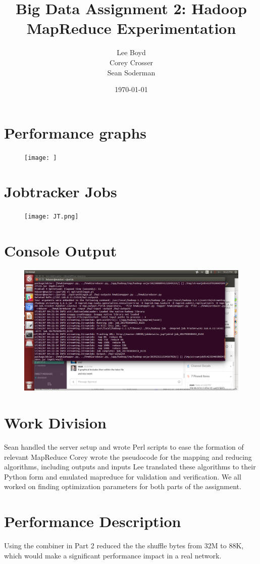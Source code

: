 \documentclass[14pt]{extarticle}
\begin{document}
\title{Big Data Assignment 2: Hadoop MapReduce Experimentation}
\author{Lee Boyd \\
        Corey Crosser \\
        Sean Soderman
        }
\date{\today}
\maketitle

\section{Performance graphs}

\begin{figure}[H]
\centering
\texttt{[image: ]}
\caption{}
\end{figure}


\section{Jobtracker Jobs}
\begin{figure}[H]
\centering
\texttt{[image: JT.png]}
\caption{}
\end{figure}


\section{Console Output}
\begin{figure}[H]
\centering
\includegraphics[width=5.2in]{consolescrnshot.png}
\caption{}
\end{figure}

\section{Work Division}
Sean handled the server setup and wrote Perl scripts to ease the formation of relevant MapReduce 
Corey wrote the pseudocode for the mapping and reducing algorithms, including outputs and inputs
Lee translated these algorithms to their Python form and emulated mapreduce for validation and verification. 
We all worked on finding optimization parameters for both parts of the assignment. 

\section{Performance Description}
Using the combiner in Part 2 reduced the the shuffle bytes from 32M to 88K, which
would make a significant performance impact in a real network.
\end{document}
